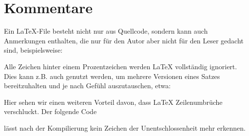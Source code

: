 \section{Kommentare}
Ein \LaTeX{}-File besteht nicht nur aus Quellcode, sondern kann auch Anmerkungen enthalten, die nur für den Autor aber nicht für den Leser gedacht sind, beispielsweise:
Alle Zeichen hinter einem Prozentzeichen werden LaTeX vollständig ignoriert.
Dies kann z.B. auch genutzt werden, um mehrere Versionen eines Satzes bereitzuhalten und je nach Gefühl auszutauschen, etwa:
Hier sehen wir einen weiteren Vorteil davon, dass \LaTeX{} Zeilenumbrüche verschluckt.
Der folgende Code
lässt nach der Kompilierung kein Zeichen der Unentschlossenheit mehr erkennen.

